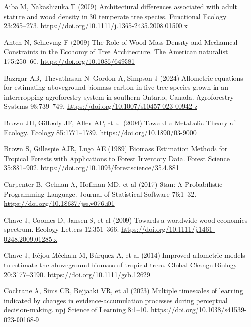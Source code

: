 \documentclass[
  12pt,
  letterpaper,
  DIV=11,
  numbers=noendperiod]{scrartcl}
\newlength{\cslhangindent}
\newlength{\cslentryspacingunit} %
\newenvironment{CSLReferences}[2] %
 {%
  \setlength{\parindent}{0pt}
  \ifodd #1
  \let\oldpar\par
  \def\par{\hangindent=\cslhangindent\oldpar}
  \fi
  \setlength{\parskip}{#2\cslentryspacingunit}
 }%
 {}
\begin{document}
\hypertarget{refs}{}
\begin{CSLReferences}{1}{0}
\leavevmode{}%
Aiba M, Nakashizuka T (2009) Architectural differences associated with
adult stature and wood density in 30 temperate tree species. Functional
Ecology 23:265--273.
\url{https://doi.org/10.1111/j.1365-2435.2008.01500.x}

\leavevmode{}%
Anten N, Schieving F (2009) The {Role} of {Wood} {Mass} {Density} and
{Mechanical} {Constraints} in the {Economy} of {Tree} {Architecture}.
The American naturalist 175:250--60.
\url{https://doi.org/10.1086/649581}

\leavevmode{}%
Bazrgar AB, Thevathasan N, Gordon A, Simpson J (2024) Allometric
equations for estimating aboveground biomass carbon in five tree species
grown in an intercropping agroforestry system in southern {Ontario},
{Canada}. Agroforestry Systems 98:739--749.
\url{https://doi.org/10.1007/s10457-023-00942-z}

\leavevmode{}%
Brown JH, Gillooly JF, Allen AP, et al (2004) Toward a {Metabolic}
{Theory} of {Ecology}. Ecology 85:1771--1789.
\url{https://doi.org/10.1890/03-9000}

\leavevmode{}%
Brown S, Gillespie AJR, Lugo AE (1989) Biomass {Estimation} {Methods}
for {Tropical} {Forests} with {Applications} to {Forest} {Inventory}
{Data}. Forest Science 35:881--902.
\url{https://doi.org/10.1093/forestscience/35.4.881}

\leavevmode{}%
Carpenter B, Gelman A, Hoffman MD, et al (2017) Stan: {A}
{Probabilistic} {Programming} {Language}. Journal of Statistical
Software 76:1--32. \url{https://doi.org/10.18637/jss.v076.i01}

\leavevmode{}%
Chave J, Coomes D, Jansen S, et al (2009) Towards a worldwide wood
economics spectrum. Ecology Letters 12:351--366.
\url{https://doi.org/10.1111/j.1461-0248.2009.01285.x}

\leavevmode{}%
Chave J, Réjou-Méchain M, Búrquez A, et al (2014) Improved allometric
models to estimate the aboveground biomass of tropical trees. Global
Change Biology 20:3177--3190. \url{https://doi.org/10.1111/gcb.12629}

\leavevmode{}%
Cochrane A, Sims CR, Bejjanki VR, et al (2023) Multiple timescales of
learning indicated by changes in evidence-accumulation processes during
perceptual decision-making. npj Science of Learning 8:1--10.
\url{https://doi.org/10.1038/s41539-023-00168-9}


\end{CSLReferences}
\end{document}
